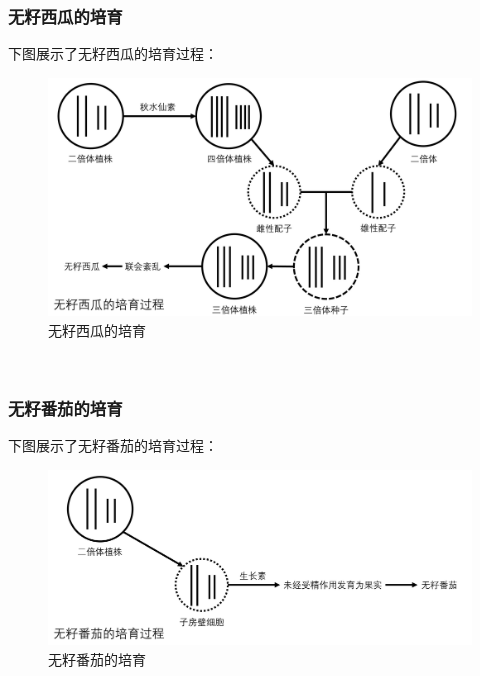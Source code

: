 \documentclass[UTF8]{ctexart}
\begin{document}
\subsubsection{无籽西瓜的培育}
    下图展示了无籽西瓜的培育过程：\vspace{5pt}
    \begin{figure}[h]
        \begin{center}
            \includegraphics[width=12cm]{BiologyImage/61.jpg}
        \end{center}
        \caption{无籽西瓜的培育}
    \end{figure}\\

\subsubsection{无籽番茄的培育}
    下图展示了无籽番茄的培育过程：\vspace{5pt}
    \begin{figure}[h]
        \begin{center}
            \includegraphics[width=12cm]{BiologyImage/62.jpg}
        \end{center}
        \caption{无籽番茄的培育}
    \end{figure}\\

\newpage
\end{document}
